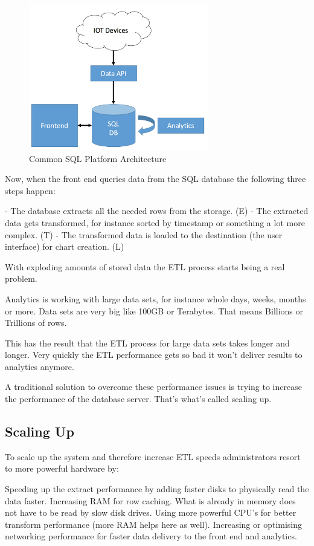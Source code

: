 \documentclass[12pt, numbers=noenddot]{scrreprt} %
\begin{document}
\begin{figure}[htbp]
  \centering
     \includegraphics[width=0.7\textwidth]{images/Common-SQL-Architecture.png}
  \caption{Common SQL Platform Architecture}
  \label{fig:Bild1}
\end{figure}

Now, when the front end queries data from the SQL database the following three steps happen:

- The database extracts all the needed rows from the storage. (E)
- The extracted data gets transformed, for instance sorted by timestamp or something a lot more complex. (T)
- The transformed data is loaded to the destination (the user interface) for chart creation. (L)

With exploding amounts of stored data the ETL process starts being a real problem.

Analytics is working with large data sets, for instance whole days, weeks, months or more. Data sets are very big like 100GB or Terabytes. That means Billions or Trillions of rows.

This has the result that the ETL process for large data sets takes longer and longer. Very quickly the ETL performance gets so bad it won’t deliver results to analytics anymore.

A traditional solution to overcome these performance issues is trying to increase the performance of the database server. That’s what’s called scaling up.

\subsection{Scaling Up}
To scale up the system and therefore increase ETL speeds administrators resort to more powerful hardware by:

Speeding up the extract performance by adding faster disks to physically read the data faster.
Increasing RAM for row caching. What is already in memory does not have to be read by slow disk drives.
Using more powerful CPU’s for better transform performance (more RAM helps here as well).
Increasing or optimising networking performance for faster data delivery to the front end and analytics.
\end{document}
